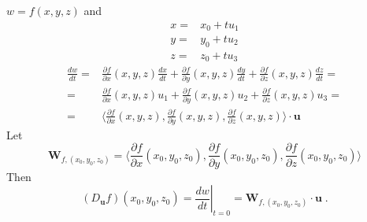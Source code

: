 \begin{frame}
  \frametitle{}
%
$w =f(x,y,z)$ and
%
\begin{align*}
  x = & x_0 + tu_1 \\
  y = & y_0 + tu_2 \\
  z = & z_0 + tu_3
\end{align*}
%
\pause
%
\begin{align*}
  \frac{dw}{dt} = & \frac{\partial f}{\partial x}(x,y,z) \frac{dx}{dt} + \frac{\partial f}{\partial y}(x,y,z) \frac{dy}{dt} + \frac{\partial f}{\partial z}(x,y,z) \frac{dz}{dt} = \\
  = & \frac{\partial f}{\partial x}(x,y,z) u_1 + \frac{\partial f}{\partial y}(x,y,z) u_2 + \frac{\partial f}{\partial z}(x,y,z) u_3 = \\
  = & \langle \frac{\partial f}{\partial x}(x,y,z) , \frac{\partial f}{\partial y}(x,y,z), \frac{\partial f}{\partial z}(x,y,z)\rangle \cdot \textbf{u}
\end{align*}
%
\pause
Let
%
$$\textbf{W}_{f,(x_0,y_0,z_0)} =\langle \frac{\partial f}{\partial x}(x_0,y_0,z_0) , \frac{\partial f}{\partial y}(x_0,y_0,z_0), \frac{\partial f}{\partial z}(x_0,y_0,z_0)\rangle$$
%
\pause
Then
%
$$(D_{\textbf{u}}f)(x_0,y_0,z_0) = \left. \frac{dw}{dt}\right|_{t=0} = \textbf{W}_{f,(x_0,y_0,z_0)} \cdot \textbf{u}\; .$$
\end{frame}

